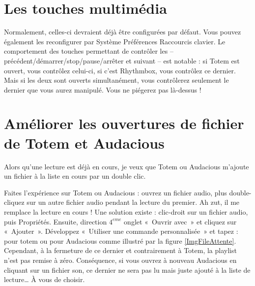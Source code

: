 \section{Les touches multimédia}
Normalement, celles-ci devraient déjà être configurées par défaut. Vous pouvez également les reconfigurer par Système \FlecheDroite Préférences \FlecheDroite Raccourcis clavier. Le comportement des touches permettant de contrôler les -- précédent/\IndicCesure{}démarrer/\IndicCesure{}stop/\IndicCesure{}pause/\IndicCesure{}arrêter et suivant -- est notable : si Totem est ouvert, vous contrôlez celui-ci, si c'est Rhythmbox, vous contrôlez ce dernier. Mais si les deux sont ouverts simultanément, vous contrôlerez seulement le dernier que vous aurez manipulé. Vous ne piégerez pas  là-dessus !
\section{Améliorer les ouvertures de fichier de Totem et Audacious}
Alors qu'une lecture est déjà en cours, je veux que Totem ou Audacious m'ajoute un fichier à la liste en cours par un double clic.\par
{}
Faites l'expérience sur Totem ou Audacious : ouvrez un fichier audio, plus double-cliquez sur un autre fichier audio pendant la lecture du premier. Ah zut, il me remplace la lecture en cours ! Une solution existe : clic-droit sur un fichier audio, puis Propriétés. Ensuite, direction $4^{eme}$ onglet «~Ouvrir avec~» et cliquez sur «~Ajouter~». Développez «~Utiliser une commande personnalisée~» et tapez :  pour totem ou  pour Audacious comme illustré par la figure \ref{ImgFileAttente}. Cependant, à la fermeture de ce dernier et contrairement à Totem, la playlist n'est pas remise à zéro. Conséquence, si vous ouvrez à nouveau Audacious en cliquant sur un fichier son, ce dernier ne sera pas lu mais juste ajouté à la liste de lecture\ldots{} À vous de choisir.\par
